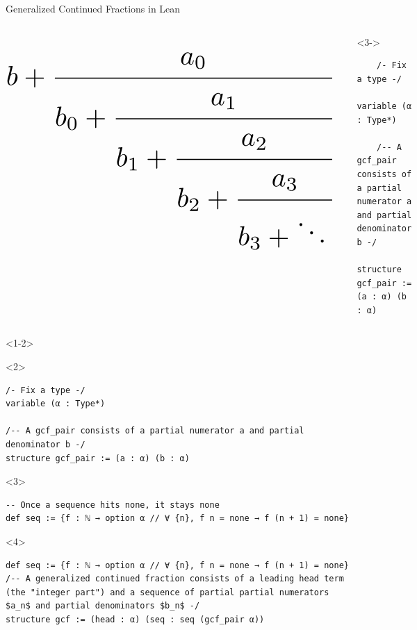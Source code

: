 \documentclass{beamer}
\begin{document}
\begin{frame}[fragile]{Generalized Continued Fractions in Lean}
\begin{columns}
\begin{equation*}
\resizebox{1\hsize}{!}{$
b + \cfrac{a_0}{b_0 + \cfrac{a_1}{b_1 + \cfrac{a_2}{b_2 + \cfrac{a_3}{b_3 + \ddots\,}}}}$
}
\end{equation*}
\pause
{}
\begin{onlyenv}<3->
    \begin{verbatim}
    /- Fix a type -/
    variable (α : Type*)

    /-- A gcf_pair consists of a partial numerator a and partial denominator b -/
    structure gcf_pair := (a : α) (b : α)
    \end{verbatim}   
\end{onlyenv}
\end{columns}
\begin{onlyenv}<1-2>
\begin{visibleenv}<2>
\begin{verbatim}
/- Fix a type -/
variable (α : Type*)

/-- A gcf_pair consists of a partial numerator a and partial denominator b -/
structure gcf_pair := (a : α) (b : α)
\end{verbatim}
\end{visibleenv}
\end{onlyenv}
\begin{onlyenv}<3>
\begin{verbatim}
-- Once a sequence hits none, it stays none
def seq := {f : ℕ → option α // ∀ {n}, f n = none → f (n + 1) = none}
\end{verbatim}
\end{onlyenv}
\begin{onlyenv}<4>
\begin{verbatim}
def seq := {f : ℕ → option α // ∀ {n}, f n = none → f (n + 1) = none}
/-- A generalized continued fraction consists of a leading head term (the "integer part") and a sequence of partial partial numerators $a_n$ and partial denominators $b_n$ -/
structure gcf := (head : α) (seq : seq (gcf_pair α))
\end{verbatim}
\end{onlyenv}
\end{frame}
\end{document}
